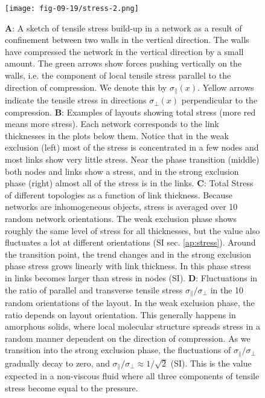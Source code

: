 \documentclass[nofootinbib,preprint,floatfix,titlepage,endfloats]{revtex4} %
\begin{document}
\begin{figure}
    \centering
    \texttt{[image: fig-09-19/stress-2.png]}
    \caption{\scriptsize
    {\bf A}: A sketch of tensile stress build-up in a network as a result of confinement between two walls in the vertical direction. 
    The walls have compressed the network in the vertical direction by a small amount. 
    The green arrows show forces pushing vertically on the walls, i.e. the component of local tensile stress parallel to the direction of compression. 
    We denote this by $\sigma_\parallel(x)$. 
    Yellow arrows indicate the tensile stress in directions $\sigma_\perp(x)$
    perpendicular to the compression. 
    {\bf B}: Examples of layouts showing total stress (more red means more stress).  
    Each network corresponds to the  link thicknesses in the plots below them.
    Notice that in the weak exclusion (left) most of the stress is concentrated in a few nodes and most links show very little stress. 
    Near the phase transition (middle) both nodes and links show a stress, and in the strong exclusion phase (right) almost all of the stress is in the links. 
    {\bf C}: Total Stress of different topologies as a function of link thickness. Because networks are inhomogeneous objects, stress is averaged over 10 random network orientations. The weak exclusion phase shows roughly the same level of stress for all thicknesses, but the value also fluctuates a lot at different orientations (SI sec. \ref{ap:stress}).  Around the transition point, the trend changes and in the strong exclusion phase stress grows linearly with link thickness. In this phase stress in links becomes larger than stress in nodes (SI). {\bf D}: Fluctuations in the ratio of parallel and transverse tensile stress $\sigma_\parallel/\sigma_\perp$ in the 10 random orientations of the layout. In the weak exclusion phase, the ratio depends on layout orientation. This generally happens in amorphous solids, where local molecular structure spreads stress in a random manner dependent on the direction of compression. As we transition into the strong exclusion phase, the fluctuations of $\sigma_\parallel/\sigma_\perp$ gradually decay to zero, and $\sigma_\parallel/\sigma_\perp \approx 1/\sqrt{2}$ (SI). This is the value expected in a non-viscous fluid where all three components of tensile stress become equal to the pressure.}
    \label{fig:stress}
\end{figure}
%
%
\end{document}
